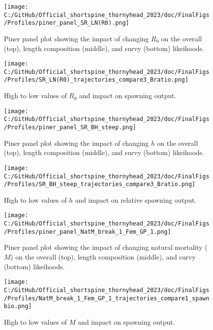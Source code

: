 \documentclass[11pt,
  english,
  letterpaper,
]{article}
\begin{document}
\begin{figure}
\centering
\texttt{[image: C:/GitHub/Official\_shortspine\_thornyhead\_2023/doc/FinalFigs/Profiles/piner\_panel\_SR\_LN(R0).png]}
\caption{Piner panel plot showing the impact of changing \(R_0\) on the overall (top), length composition (middle), and survy (bottom) likeihoods.\label{fig:R0_prof}}
\end{figure}

\begin{figure}
\centering
\texttt{[image: C:/GitHub/Official\_shortspine\_thornyhead\_2023/doc/FinalFigs/Profiles/SR\_LN(R0)\_trajectories\_compare3\_Bratio.png]}
\caption{High to low values of \(R_0\) and impact on spawning output.\label{fig:R0_spawnout}}
\end{figure}

\begin{figure}
\centering
\texttt{[image: C:/GitHub/Official\_shortspine\_thornyhead\_2023/doc/FinalFigs/Profiles/piner\_panel\_SR\_BH\_steep.png]}
\caption{Piner panel plot showing the impact of changing \(h\) on the overall (top), length composition (middle), and survy (bottom) likeihoods.\label{fig:h_piner_prof}}
\end{figure}

\begin{figure}
\centering
\texttt{[image: C:/GitHub/Official\_shortspine\_thornyhead\_2023/doc/FinalFigs/Profiles/SR\_BH\_steep\_trajectories\_compare3\_Bratio.png]}
\caption{High to low values of \(h\) and impact on relative spawning output.\label{fig:h_spawnout}}
\end{figure}

\begin{figure}
\centering
\texttt{[image: C:/GitHub/Official\_shortspine\_thornyhead\_2023/doc/FinalFigs/Profiles/piner\_panel\_NatM\_break\_1\_Fem\_GP\_1.png]}
\caption{Piner panel plot showing the impact of changing natural mortality (\(M\)) on the overall (top), length composition (middle), and survy (bottom) likeihoods.\label{fig:M_prof}}
\end{figure}

\begin{figure}
\centering
\texttt{[image: C:/GitHub/Official\_shortspine\_thornyhead\_2023/doc/FinalFigs/Profiles/NatM\_break\_1\_Fem\_GP\_1\_trajectories\_compare1\_spawnbio.png]}
\caption{High to low values of \(M\) and impact on spawning output.\label{fig:M_spawnout}}
\end{figure}
\end{document}
